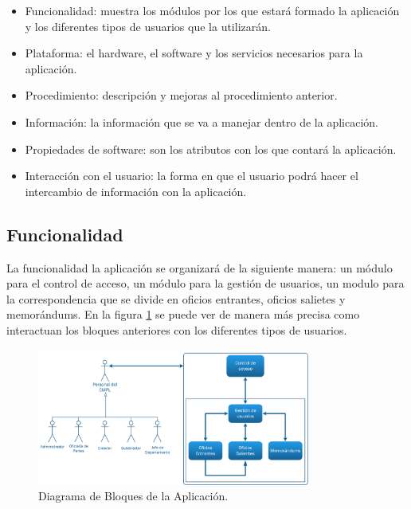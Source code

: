 \begin{itemize}
	\item Funcionalidad: muestra los módulos por los que estará formado la aplicación y los diferentes tipos de usuarios que la utilizarán.
	\item Plataforma: el hardware, el software y los servicios necesarios para la aplicación.
	\item Procedimiento: descripción y mejoras al procedimiento anterior.
	\item Información: la información que se va a manejar dentro de la aplicación.
	\item Propiedades de software: son los atributos con los que contará la aplicación.
	\item Interacción con el usuario: la forma en que el usuario podrá hacer el intercambio de información con la aplicación.
\end{itemize}


\subsection{Funcionalidad}

La funcionalidad la aplicación se organizará de la siguiente manera: un módulo para el control de acceso, un módulo para la gestión de usuarios, un modulo para la correspondencia que se divide en oficios entrantes, oficios salietes y memorándums. En la figura \ref{diagrama a bloques} se puede ver de manera más precisa como interactuan los bloques anteriores con los diferentes tipos de usuarios.\\

	\begin{figure}[htbp!]
		\centering
			\includegraphics[width=0.8\textwidth]{images/propuesta/diagramabloques}
		\caption{Diagrama de Bloques de la Aplicación.}
		\label{diagrama a bloques}
	\end{figure}

